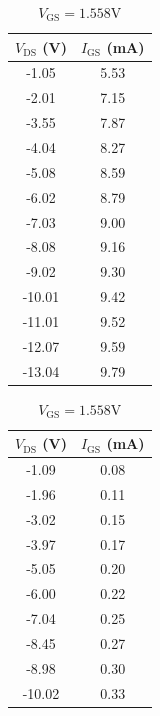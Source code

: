 \documentclass[%
sor,
 jor,
 amsmath,amssymb,
 reprint,
]{revtex4-2}
\begin{document}
\begin{table}[H]
\begin{minipage}{0.30\linewidth}
\begin{center}
\begin{tabular}{|c|c|}
\hline
$V_{\text{DS}}$  (V) & $I_{\text{GS}}$ (mA) \\
\hline
-1.05 & 5.53 \\
-2.01 & 7.15 \\
-3.55 & 7.87 \\
-4.04 & 8.27 \\
-5.08 & 8.59 \\
-6.02 & 8.79 \\
-7.03 & 9.00 \\
-8.08 & 9.16 \\
-9.02 & 9.30 \\
-10.01 & 9.42 \\
-11.01 & 9.52 \\
-12.07 & 9.59 \\
-13.04 & 9.79 \\
\hline
\end{tabular}
\caption{$V_{\text{GS}} = 0\si{\volt}$}
\end{center}
\end{minipage}
\begin{minipage}{0.30\linewidth}
	\begin{center}

\begin{tabular}{|c|c|}
\hline
$V_{\text{DS}}$  (V) & $I_{\text{GS}}$ (mA) \\
\hline
-1.09 & 0.08 \\
-1.96 & 0.11 \\
-3.02 & 0.15 \\
-3.97 & 0.17 \\
-5.05 & 0.20 \\
-6.00 & 0.22 \\
-7.04 & 0.25 \\
-8.45 & 0.27 \\
-8.98 & 0.30 \\
-10.02 & 0.33 \\
\hline
\end{tabular}
\caption{$V_{\text{GS}} = 1.558\si{\volt}$}
\end{center}
\end{minipage}
\begin{minipage}{0.30\linewidth}
	\begin{center}


\end{center}
\end{minipage}
\end{table}
\end{document}

